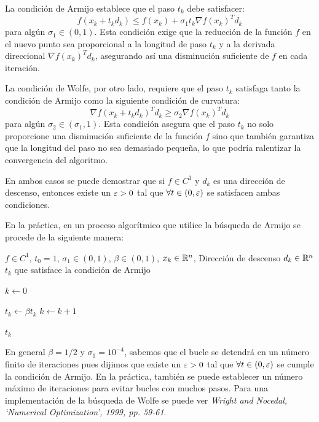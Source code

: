 La condición de Armijo establece que el paso \( t_k \) debe satisfacer:
\[
    f(x_k + t_k d_k) \leq f(x_k) + \sigma_1 t_k {\nabla f(x_k)}^T d_k
\]
para algún \( \sigma_1 \in (0, 1) \). Esta condición exige que la reducción de la función \( f \) en el nuevo punto sea proporcional a la longitud de paso \( t_k \) y a la derivada direccional \( {\nabla f(x_k)}^T d_k \), asegurando así una disminución suficiente de \( f \) en cada iteración.

La condición de Wolfe, por otro lado, requiere que el paso \( t_k \) satisfaga tanto la condición de Armijo como la siguiente condición de curvatura:
\[
    {\nabla f(x_k + t_k d_k)}^T d_k \geq \sigma_2 {\nabla f(x_k)}^T d_k
\]
para algún \( \sigma_2 \in (\sigma_1, 1) \). Esta condición asegura que el paso \( t_k \) no solo proporcione una disminución suficiente de la función \( f \) sino que también garantiza que la longitud del paso no sea demasiado pequeña, lo que podría ralentizar la convergencia del algoritmo.

En ambos casos se puede demostrar que si \( f \in C^1 \) y \( d_k \) es una dirección de descenso, entonces existe un \( \varepsilon > 0 \) tal que \( \forall t \in (0, \varepsilon) \) se satisfacen ambas condiciones.

\clearpage

En la práctica, en un proceso algorítmico que utilice la búsqueda de Armijo se procede de la siguiente manera:

\begin{algorithm}
    \caption{Búsqueda de Armijo}
    \label{alg:armijo}
    \begin{algorithmic}[1]
        \Require \( f \in C^1 \), \( t_0 = 1 \), \( \sigma_1 \in (0, 1) \), \( \beta \in (0, 1) \), \( x_k \in \mathbb{R}^n \), Dirección de descenso \( d_k \in \mathbb{R}^n \)
        \Ensure \( t_k \) que satisface la condición de Armijo

        \State \( k \gets 0 \)

         

        \State \( t_k \gets \beta t_k \) 
        \State \( k \gets k + 1 \)

        \EndWhile

        \State \Return \( t_k \)
    \end{algorithmic}
\end{algorithm}

En general \( \beta = 1/2 \) y \( \sigma_1 = 10^{-4} \), sabemos que el bucle se detendrá en un número finito de iteraciones pues dijimos que existe un \( \varepsilon > 0 \) tal que \( \forall t \in (0, \varepsilon) \) se cumple la condición de Armijo. En la práctica, también se puede establecer un número máximo de iteraciones para evitar bucles con muchos pasos.
Para una implementación de la búsqueda de Wolfe se puede ver \emph{Wright and Nocedal, ‘Numerical Optimization’, 1999, pp. 59-61}.

